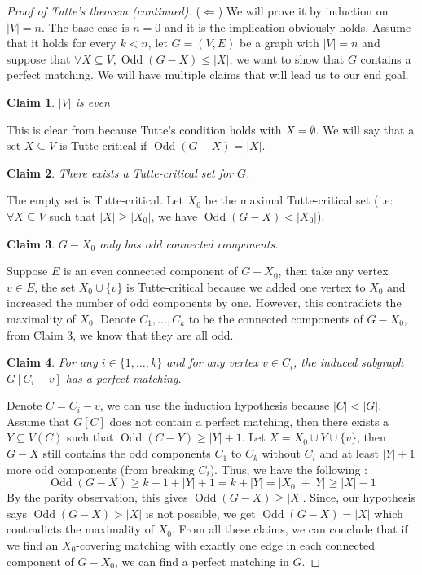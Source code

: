 \documentclass{tufte-handout}
\newtheorem{claim}{Claim}
\theoremstyle{definition}
\theoremstyle{remark}
\DeclareMathOperator{\odd}{Odd}
\begin{document}
\begin{proof}[Proof of Tutte's theorem (continued)]
	($\Leftarrow$) We will prove it by induction on $|V| = n$. The base case is $n=0$ and it is the implication obviously holds. Assume that it holds for every $k < n$, let $G = (V,E)$ be a graph with $|V| = n$ and suppose that $\forall X \subseteq V, \odd(G-X) \leq |X|$, we want to show that $G$ contains a perfect matching. We will have multiple claims that will lead us to our end goal.
	\begin{claim}
		$|V|$ is even
	\end{claim}
	This is clear from because Tutte's condition holds with $X = \emptyset$. We will say that a set $X \subseteq V$ is Tutte-critical if $\odd(G-X) = |X|$.
	\begin{claim}
		There exists a Tutte-critical set for $G$.
	\end{claim}
	The empty set is Tutte-critical. Let $X_0$ be the maximal Tutte-critical set (i.e: $\forall X\subseteq V$ such that $|X| \geq |X_0|$, we have $\odd(G-X) < |X_0|$). 
	\begin{claim}
		$G-X_0$ only has odd connected components.
	\end{claim}
	Suppose $E$ is an even connected component of $G-X_0$, then take any vertex $v \in E$, the set $X_0 \cup \{v\}$ is Tutte-critical because we added one vertex to $X_0$ and increased the number of odd components by one. However, this contradicts the maximality of $X_0$. Denote $C_1, \dots, C_k$ to be the connected components of $G-X_0$, from Claim 3, we know that they are all odd.
	\begin{claim}
		For any $i \in \{1,\dots, k\}$ and for any vertex $v \in C_i$, the induced subgraph $G[C_i - v]$ has a perfect matching.
	\end{claim}
	Denote $C = C_i-v$, we can use the induction hypothesis because $|C| < |G|$. Assume that $G[C]$ does not contain a perfect matching, then there exists a $Y \subseteq V(C)$ such that $\odd(C-Y) \geq |Y| + 1$. Let $X = X_0 \cup Y \cup \{v\}$, then $G-X$ still contains the odd components $C_1$ to $C_k$ without $C_i$ and at least $|Y| + 1$ more odd components (from breaking $C_i$). Thus, we have the following :
	\[ \odd(G-X) \geq k - 1 + |Y| + 1 = k + |Y| = |X_0| + |Y| \geq |X| - 1\]
	By the parity observation, this gives $\odd(G-X) \geq |X|$. Since, our hypothesis says $\odd(G-X) > |X|$ is not possible, we get $\odd(G-X) = |X|$ which contradicts the maximality of $X_0$.
	From all these claims, we can conclude that if we find an $X_0$-covering matching with exactly one edge in each connected component of $G-X_0$, we can find a perfect matching in $G$.

\end{proof}
\end{document}

